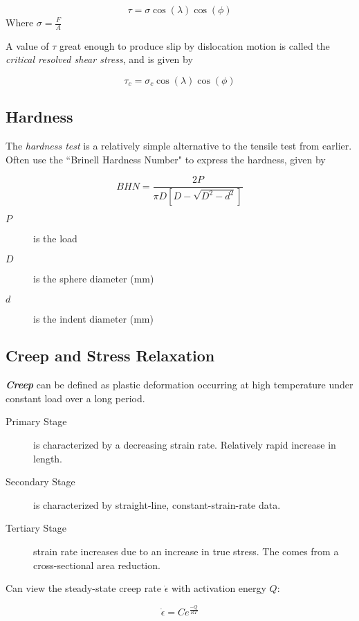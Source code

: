 \documentclass[10pt,letterpaper]{article}
\begin{document}

	$$
	\tau = \sigma \cos( \lambda ) \cos(\phi)
	$$
	Where $\sigma = \frac{F}{A}$ 
	
	A value of $\tau$ great enough to produce slip by dislocation motion is called the \textit{critical resolved shear stress}, and is given by
	
	$$
	\tau_c = \sigma_c \cos (\lambda) \cos (\phi)
	$$
	
	\subsection{Hardness}
	The \textit{hardness test} is a relatively simple alternative to the tensile test from earlier. Often use the ``Brinell Hardness Number" to express the hardness, given by
	
	$$
	BHN = \frac{2P}{\pi D [D - \sqrt{D^2 - d^2}]}
	$$
	\begin{description}
		\item[$P$] is the load
		\item[$D$] is the sphere diameter (mm)
		\item[$d$] is the indent diameter (mm)
	\end{description}
	\subsection{Creep and Stress Relaxation}
	\textit{\textbf{Creep}} can be defined as plastic deformation occurring at high temperature under constant load over a long period. 
	\begin{description}
		\item[Primary Stage] is characterized by a decreasing strain rate.  Relatively rapid increase in length. 
		\item[Secondary Stage] is characterized by straight-line, constant-strain-rate data. 
		\item[Tertiary Stage] strain rate increases due to an increase in true stress.  The comes from a cross-sectional area reduction. 
	\end{description} 
	
	Can view the steady-state creep rate $\dot{\epsilon}$ with activation energy $Q$: 
	
	$$
	\dot{\epsilon} = Ce^{\frac{-Q}{RT}}
	$$
	
\end{document}

